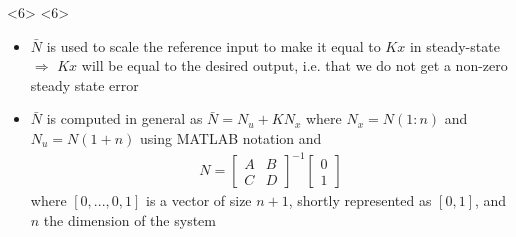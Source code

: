 \begin{frame}
\begin{onlyenv}<6>
<6>
\begin{itemize}
	\item $\bar{N}$ is used to scale the reference input to make it equal to $K x$ in steady-state
	$\Rightarrow$ $K x$ will be equal to the desired output, i.e. that we do not get a non-zero steady state error
	\item $\bar{N}$ is computed in general as $\bar{N} = N_u + KN_x$ where $N_x = N(1:n)$ and $N_u = N(1+n)$ using MATLAB notation and
	\begin{align*}
	N = \begin{bmatrix}
	A & B \\ 
	C & D
	\end{bmatrix} ^{-1}
	\begin{bmatrix}
	0 \\ 
	1
	\end{bmatrix}
	\end{align*}
	where $[0,...,0,1]$ is a vector of size $n+1$, shortly represented as $[0,1]$, and $n$ the dimension of the system
\end{itemize}
\end{onlyenv}

\end{frame}